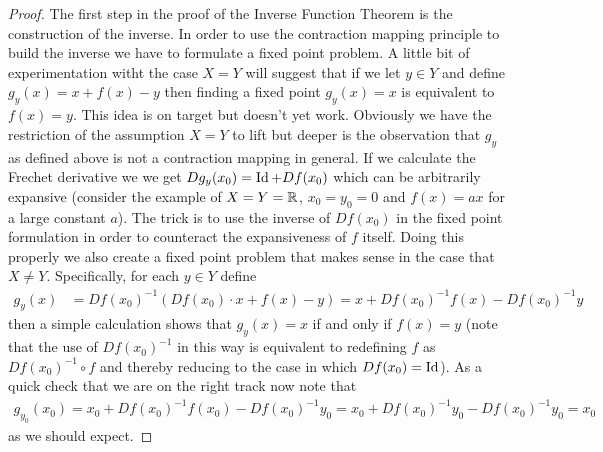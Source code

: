 \begin{proof}
The first step in the proof of the Inverse Function Theorem is the construction of the inverse.  In order to use the contraction mapping principle to build the inverse we have to formulate a fixed point problem.  A little bit of experimentation witht the case $X=Y$ will suggest that if we let $y \in Y$ and define $g_y(x) = x + f(x) - y$ then finding a fixed point $g_y(x) = x$ is equivalent to $f(x) = y$.  This idea is on target but doesn't yet work.  Obviously we have the restriction of the assumption $X=Y$ to lift but deeper is the observation that $g_y$ as defined above is not a contraction mapping in general.  If we calculate the Frechet derivative we
we get $Dg_y(x_0) = \operatorname*{Id} + Df(x_0)$ which can be arbitrarily expansive (consider the example of $X=Y=\mathbb{R}$, $x_0=y_0=0$ and $f(x) = ax$ for a large constant $a$).  The trick is to use the inverse of $Df(x_0)$ in the fixed point formulation in order to counteract the expansiveness of $f$ itself.  Doing this properly we also create a fixed point problem that makes sense in the case that $X \neq Y$.  Specifically, for each $y \in Y$ define
\begin{align*}
g_y(x) &= Df(x_0)^{-1} (Df(x_0) \cdot x + f(x) - y) = x + Df(x_0)^{-1} f (x) -  Df(x_0)^{-1} y
\end{align*}
then a simple calculation shows that $g_y(x) = x$ if and only if $f(x) = y$ (note that the use of $Df(x_0)^{-1}$ in this way is equivalent to redefining $f$ as $Df(x_0)^{-1} \circ f$ and thereby reducing to the case in which $Df(x_0) = \operatorname*{Id}$).  As a quick check that we are on the right track now note that
\begin{align*}
g_{y_0}(x_0) = x_0 + Df(x_0)^{-1} f (x_0) -  Df(x_0)^{-1} y_0 = x_0 + Df(x_0)^{-1} y_0 -  Df(x_0)^{-1} y_0 = x_0
\end{align*}
as we should expect.


\end{proof}
